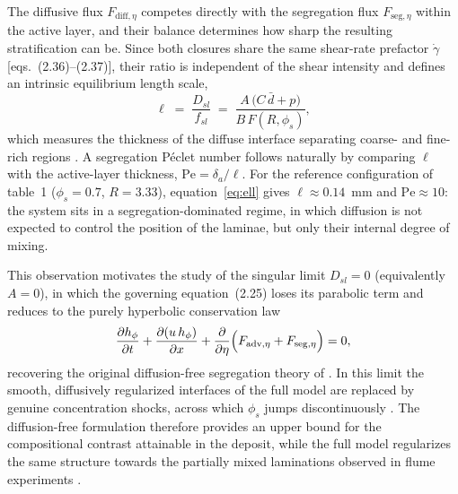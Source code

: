 \documentclass[lineno]{JFM-FLM_Au}
\begin{document}
The diffusive flux $F_{\mathrm{diff},\eta}$ competes directly with the
segregation flux $F_{\mathrm{seg},\eta}$ within the active layer, and their
balance determines how sharp the resulting stratification can be. Since both
closures share the same shear-rate prefactor $\dot\gamma$
[eqs.~(2.36)--(2.37)], their ratio is independent of the shear intensity and
defines an intrinsic equilibrium length scale,
\begin{equation}
\ell \;=\; \frac{D_{sl}}{f_{sl}}
      \;=\; \frac{A\,\bigl(C\,\bar d + p\bigr)}{B\,F(R,\phi_s)},
\label{eq:ell}
\end{equation}
which measures the thickness of the diffuse interface separating coarse- and
fine-rich regions \citep{graychugunov2006}. A segregation P\'eclet number
follows naturally by comparing $\ell$ with the active-layer thickness,
$\mathrm{Pe} = \delta_a/\ell$. For the reference configuration of table~1
($\phi_s = 0.7$, $R = 3.33$), equation~\eqref{eq:ell} gives
$\ell \approx 0.14$~mm and $\mathrm{Pe} \approx 10$: the system sits in a
segregation-dominated regime, in which diffusion is not expected to control
the position of the laminae, but only their internal degree of mixing.

This observation motivates the study of the singular limit $D_{sl}=0$
(equivalently $A=0$), in which the governing equation~(2.25) loses its
parabolic term and reduces to the purely hyperbolic conservation law
\begin{equation}
\frac{\partial h_\phi}{\partial t}
+ \frac{\partial (u\,h_\phi)}{\partial x}
+ \frac{\partial}{\partial \eta}
  \Bigl( F_{\mathrm{adv},\eta} + F_{\mathrm{seg},\eta} \Bigr) = 0,
\label{eq:hyperbolic}
\end{equation}
recovering the original diffusion-free segregation theory of
\citet{gray2005}. In this limit the smooth, diffusively regularized
interfaces of the full model are replaced by genuine concentration shocks,
across which $\phi_s$ jumps discontinuously \citep{gray2006time,Thornton2008}.
The diffusion-free formulation therefore provides an upper bound for the
compositional contrast attainable in the deposit, while the full model
regularizes the same structure towards the partially mixed laminations
observed in flume experiments \citep{blom2003,kleinhans2004_34}.

\end{document}
